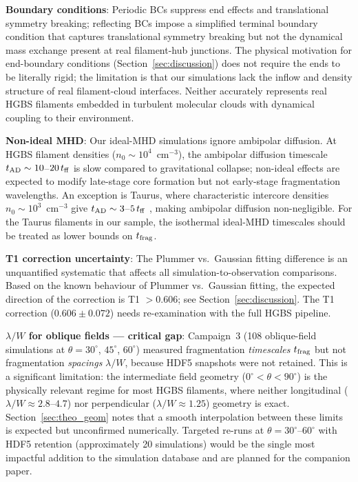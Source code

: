 \documentclass[twoside,twocolumn]{mnras}
\begin{document}
\textbf{Boundary conditions}: Periodic BCs suppress end effects and translational
symmetry breaking; reflecting BCs impose a simplified terminal boundary condition that captures translational symmetry breaking but not the dynamical mass exchange present at real filament-hub junctions. The physical motivation for end-boundary conditions (Section~\ref{sec:discussion}) does not require the ends to be literally rigid; the limitation is that our simulations lack the inflow and density structure of real filament-cloud interfaces. Neither accurately represents real HGBS filaments embedded in turbulent molecular clouds with dynamical coupling to their environment.

\textbf{Non-ideal MHD}: Our ideal-MHD simulations ignore ambipolar diffusion. At HGBS
filament densities ($n_0 \sim 10^4$~cm$^{-3}$), the ambipolar diffusion timescale
$t_{\rm AD} \sim 10$--$20\,t_{\rm ff}$ is slow compared to gravitational collapse;
non-ideal effects are expected to modify late-stage core formation but not early-stage fragmentation wavelengths. An exception is Taurus, where characteristic intercore densities $n_0 \sim 10^3$~cm$^{-3}$ give $t_{\rm AD} \sim 3$--$5\,t_{\rm ff}$ \citep{Nakamura2005}, making ambipolar diffusion non-negligible. For the Taurus filaments in our sample, the isothermal ideal-MHD timescales should be treated as lower bounds on $t_{\rm frag}$.

\textbf{T1 correction uncertainty}: The Plummer vs.\ Gaussian fitting difference is an unquantified systematic that affects all simulation-to-observation comparisons. Based on the known behaviour of Plummer vs.\ Gaussian fitting, the expected direction of the correction is T1 $> 0.606$; see Section~\ref{sec:discussion}. The
T1 correction ($0.606 \pm 0.072$) needs re-examination with the full HGBS pipeline.

\textbf{$\lambda/W$ for oblique fields --- critical gap}: Campaign~3 (108 oblique-field
simulations at $\theta = 30^\circ$, $45^\circ$, $60^\circ$) measured fragmentation
\textit{timescales} $t_{\rm frag}$ but not fragmentation \textit{spacings} $\lambda/W$,
because HDF5 snapshots were not retained. This is a significant limitation: the
intermediate field geometry ($0^\circ < \theta < 90^\circ$) is the physically relevant
regime for most HGBS filaments, where neither longitudinal ($\lambda/W \approx 2.8$--$4.7$)
nor perpendicular ($\lambda/W \approx 1.25$) geometry is exact. Section~\ref{sec:theo_geom}
notes that a smooth interpolation between these limits is expected but unconfirmed
numerically. Targeted re-runs at $\theta = 30^\circ$--$60^\circ$ with HDF5 retention
(approximately 20 simulations) would be the single most impactful addition to the
simulation database and are planned for the companion paper.
\end{document}
